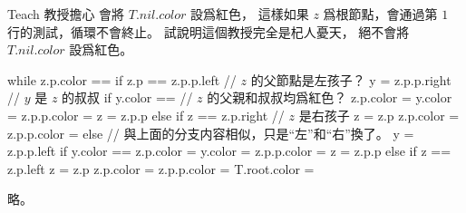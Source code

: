 \startEXERCISE
Teach 教授擔心  會將 $T.nil.color$ 設爲紅色，
這樣如果 $z$ 爲根節點，會通過第 $1$ 行的測試，循環不會終止。
試說明這個教授完全是杞人憂天，
  絕不會將 $T.nil.color$ 設爲紅色。

\startCLRSCODE
while z.p.color == \color[red]{RED}
	if z.p == z.p.p.left	// $z$ 的父節點是左孩子？
		y = z.p.p.right	// $y$ 是 $z$ 的叔叔
		if y.color == \color[red]{RED} // $z$ 的父親和叔叔均爲紅色？
			z.p.color = \color[black]{BLACK}
			y.color = \color[black]{BLACK}
			z.p.p.color = \color[red]{RED}
			z = z.p.p
		else
			if z == z.p.right // $z$ 是右孩子
				z = z.p
			z.p.color = \color[black]{BLACK}
			z.p.p.color = \color[red]{RED}
	else // 與上面的分支内容相似，只是“左”和“右”換了。
		y = z.p.p.left
		if y.color == \color[red]{RED}
			z.p.color = \color[black]{BLACK}
			y.color = \color[black]{BLACK}
			z.p.p.color = \color[red]{RED}
			z = z.p.p
		else
			if z == z.p.left
				z = z.p
			z.p.color = \color[black]{BLACK}
			z.p.p.color = \color[red]{RED}
T.root.color = \color[black]{BLACK}
\stopCLRSCODE
\stopEXERCISE

\startANSWER
略。
\stopANSWER
